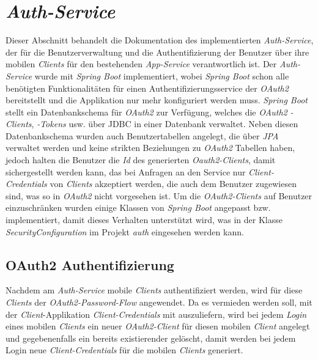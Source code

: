 \documentclass[]{article}
\begin{document}
{{{{\section{\emph{Auth-Service}}
Dieser Abschnitt behandelt die Dokumentation des implementierten \emph{Auth-Service}, der für die Benutzerverwaltung und die Authentifizierung der Benutzer über ihre mobilen \emph{Clients} für den bestehenden \emph{App-Service} verantwortlich ist. Der \emph{Auth-Service} wurde mit \emph{Spring Boot} implementiert, wobei \emph{Spring Boot} schon alle benötigten Funktionalitäten für einen Authentifizierungsservice der \emph{OAuth2} bereitstellt und die Applikation nur mehr konfiguriert werden muss.
\newline
\newline
\emph{Spring Boot} stellt ein Datenbankschema für \emph{OAuth2} zur Verfügung, welches die \emph{OAuth2} \emph{-Clients}, \emph{-Tokens} usw. über JDBC in einer Datenbank verwaltet. Neben diesen Datenbankschema wurden auch Benutzertabellen angelegt, die über \emph{JPA} verwaltet werden und keine strikten Beziehungen zu \emph{OAuth2} Tabellen haben, jedoch halten die Benutzer die \emph{Id} des generierten \emph{Oauth2-Clients}, damit sichergestellt werden kann, das bei Anfragen an den Service nur \emph{Client-Credentials} von \emph{Clients} akzeptiert werden, die auch dem Benutzer zugewiesen sind, was so in \emph{OAuth2} nicht vorgesehen ist.
\newline
\newline
Um die \emph{OAuth2-Clients} auf Benutzer einzuschränken wurden einige Klassen von \emph{Spring Boot} angepasst bzw. implementiert, damit dieses Verhalten unterstützt wird, was in der Klasse \emph{SecurityConfiguration} im Projekt \emph{auth} eingesehen werden kann.

\subsection{OAuth2 Authentifizierung}
Nachdem am \emph{Auth-Service} mobile \emph{Clients} authentifiziert werden, wird für diese \emph{Clients} der \emph{OAuth2-Password-Flow} angewendet. Da es vermieden werden soll, mit  der \emph{Client}-Applikation \emph{Client-Credentials} mit auszuliefern, wird bei jedem \emph{Login} eines mobilen \emph{Clients} ein neuer \emph{OAuth2-Client} für diesen mobilen \emph{Client}  angelegt und gegebenenfalls ein bereits existierender gelöscht, damit werden bei jedem Login neue \emph{Client-Credentials} für die mobilen \emph{Clients} generiert.

}}}}
\end{document}
